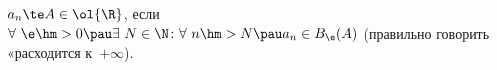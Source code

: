 
$a_n\te A\in\ol{\R}$, если $\forall\ \e\hm>0\pau \exists\  N\in\N\colon \forall\  n\hm>N\pau a_n\in B_\e(A)$ 
(правильно говорить «расходится к~$+\infty$).
